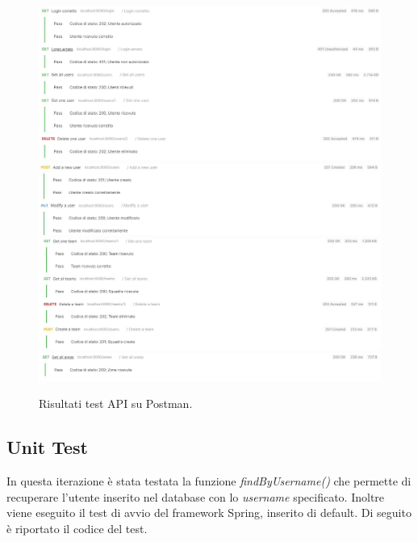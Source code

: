 \begin{itemize}
	\begin{figure}[h!]
		\centering
		\includegraphics[width=0.99\linewidth]{./Iterazione 2/ImageFiles/TestUserController1}
		\includegraphics[width=0.99\linewidth]{./Iterazione 2/ImageFiles/TestUserController2}
		\includegraphics[width=1\linewidth]{./Iterazione 2/ImageFiles/TestTeamController}
		\includegraphics[width=1\linewidth]{./Iterazione 2/ImageFiles/TestAreaController}
		\caption{Risultati test API su Postman.}
		\label{fig:RisultatiTestAPIIT2}
	\end{figure}
\end{itemize}

\clearpage

\subsection{Unit Test}
In questa iterazione è stata testata la funzione \textit{findByUsername()} che permette di recuperare l'utente inserito nel database con lo \textit{username} specificato. Inoltre viene eseguito il test di avvio del framework Spring, inserito di default. Di seguito è riportato il codice del test.

